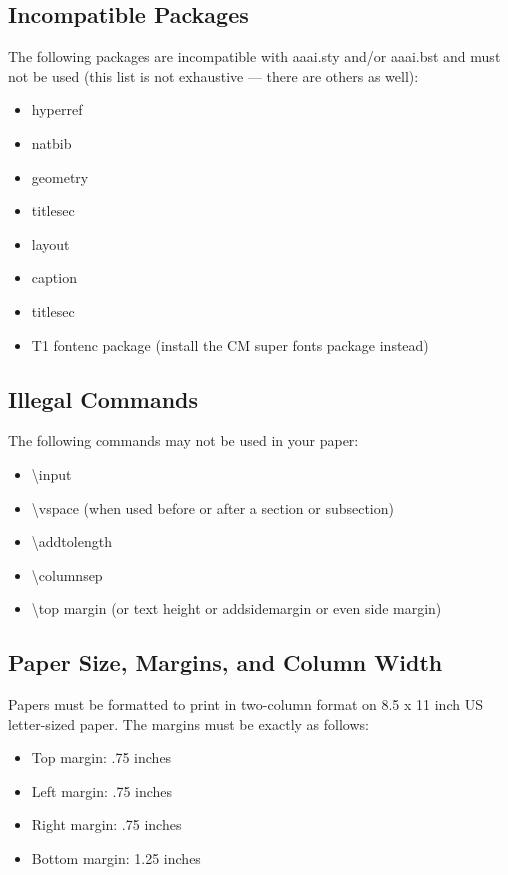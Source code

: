 \documentclass[letterpaper]{article}
\begin{document}
	\subsection{Incompatible Packages}
	The following packages are incompatible with aaai.sty and/or aaai.bst and must not be used (this list is not exhaustive --- there are others as well):
	\begin{itemize}
		\item hyperref
		\item natbib
		\item geometry
		\item titlesec
		\item layout
		\item caption
		\item titlesec
		\item T1 fontenc package (install the CM super fonts package instead)
	\end{itemize}
	
	\subsection{Illegal Commands}
	The following commands may not be used in your paper:
	\begin{itemize}
		\item \textbackslash input
		\item \textbackslash vspace (when used before or after a section or subsection)
		\item \textbackslash addtolength 
		\item \textbackslash columnsep
		\item \textbackslash top margin (or text height or addsidemargin or even side margin)
	\end{itemize}
	
	\subsection{Paper Size, Margins, and Column Width}
	Papers must be formatted to print in two-column format on 8.5 x 11 inch US letter-sized paper. The margins must be exactly as follows: 
	\begin{itemize}
		\item Top margin: .75 inches
		\item Left margin: .75 inches
		\item Right margin: .75 inches
		\item Bottom margin: 1.25 inches
	\end{itemize} 
	
\end{document}
